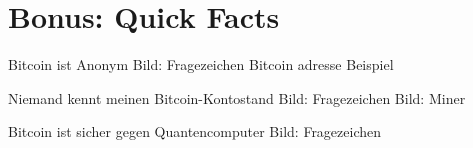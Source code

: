 \documentclass[aspectratio=169]{beamer}
\begin{document}






\section{Bonus: Quick Facts}


\begin{frame}{Bitcoin ist Anonym}
    Bild: Fragezeichen
    \pause
    Bitcoin adresse Beispiel
\end{frame}


\begin{frame}{Niemand kennt meinen Bitcoin-Kontostand}
    Bild: Fragezeichen
    \pause
    Bild: Miner
\end{frame}


\begin{frame}{Bitcoin ist sicher gegen Quantencomputer}
    Bild: Fragezeichen
\end{frame}
\end{document}
